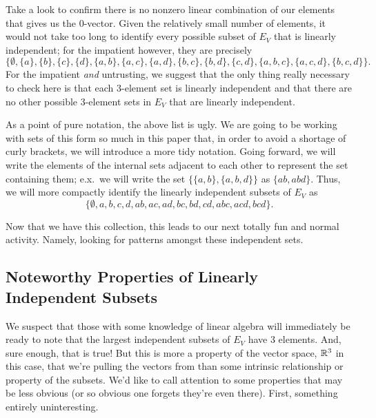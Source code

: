 \documentclass[12pt,oneside]{../../sfsuthesis}
\begin{document}
Take a look to confirm there is no nonzero linear combination of our elements that gives us the \( 0 \)-vector.
Given the relatively small number of elements, it would not take too long to identify every possible subset of \( E_V \) that is linearly independent;
for the impatient however, they are precisely
\[
    \big\{
    \emptyset,
    \{ a \},  \{ b \},  \{ c \},  \{ d \},
    \{ a,b \},  \{ a,c \},  \{ a,d \},  \{ b,c \},  \{ b,d \}, \{ c, d \},
    \{ a, b, c \},  \{ a, c, d \}, \{ b, c, d\}
    \big\}.
\]
For the impatient \emph{and} untrusting, we suggest that the only thing really necessary to check here is that each 3-element set is linearly independent and that there are no other possible 3-element sets in \( E_V \) that are linearly independent.

As a point of pure notation, the above list is ugly.
We are going to be working with sets of this form so much in this paper that, in order to avoid a shortage of curly brackets, we will introduce a more tidy notation.
Going forward, we will write the elements of the internal sets adjacent to each other to represent the set containing them;
e.x.\ we will write the set \( \big\{ \{ a, b \}, \{ a, b, d \} \big\} \) as \( \{ ab, abd \} \).
Thus, we will more compactly identify the linearly independent subsets of \( E_V \) as
\[
    \{
    \emptyset,
    a, b, c, d,
    ab, ac, ad, bc, bd, cd,
    abc, acd, bcd
    \}.
\]

Now that we have this collection,
this leads to our next totally fun and normal activity.
Namely, looking for patterns amongst these independent sets.

\subsection{Noteworthy Properties of Linearly Independent Subsets}

We suspect that those with some knowledge of linear algebra will immediately be ready to note that the largest independent subsets of \( E_V \) have 3 elements.
And, sure enough, that is true!
But this is more a property of the vector space, \( \mathbb{R}^3 \) in this case, that we're pulling the vectors from than some intrinsic relationship or property of the subsets.
We'd like to call attention to some properties that may be less obvious (or so obvious one forgets they're even there).
First, something entirely uninteresting.
\end{document}
